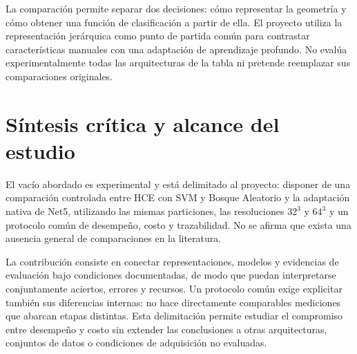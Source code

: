 La comparación permite separar dos decisiones: cómo representar la geometría y cómo obtener una función de clasificación a partir de ella. El proyecto utiliza la representación jerárquica como punto de partida común para contrastar características manuales con una adaptación de aprendizaje profundo. No evalúa experimentalmente todas las arquitecturas de la tabla ni pretende reemplazar sus comparaciones originales.
\FloatBarrier
\section{Síntesis crítica y alcance del estudio}
\label{sec:vacio-investigacion}
El vacío abordado es experimental y está delimitado al proyecto: disponer de una comparación controlada entre HCE con SVM y Bosque Aleatorio y la adaptación nativa de Net5, utilizando las mismas particiones, las resoluciones $32^3$ y $64^3$ y un protocolo común de desempeño, costo y trazabilidad. No se afirma que exista una ausencia general de comparaciones en la literatura.

La contribución consiste en conectar representaciones, modelos y evidencias de evaluación bajo condiciones documentadas, de modo que puedan interpretarse conjuntamente aciertos, errores y recursos. Un protocolo común exige explicitar también sus diferencias internas: no hace directamente comparables mediciones que abarcan etapas distintas. Esta delimitación permite estudiar el compromiso entre desempeño y costo sin extender las conclusiones a otras arquitecturas, conjuntos de datos o condiciones de adquisición no evaluadas.
